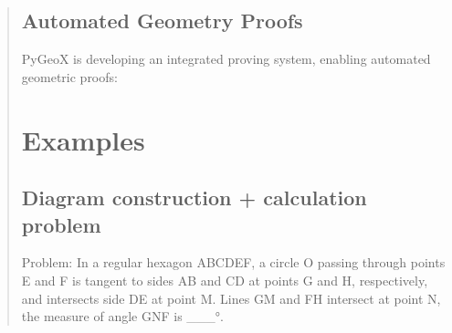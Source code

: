 \documentclass[letterpaper,10pt,english]{sphinxmanual}
\begin{document}
\begin{quote}
\section{Automated Geometry Proofs}
\label{\detokenize{index:automated-geometry-proofs}}
\sphinxAtStartPar
PyGeoX is developing an integrated proving system, enabling automated geometric proofs:

\begin{sphinxVerbatim}[commandchars=\\\{\}]
   
      

\end{sphinxVerbatim}

\sphinxstepscope


\chapter{Examples}
\label{\detokenize{examples:examples}}\label{\detokenize{examples::doc}}

\section{Diagram construction + calculation problem}
\label{\detokenize{examples:diagram-construction-calculation-problem}}
\sphinxAtStartPar
Problem: In a regular hexagon ABCDEF, a circle O passing through points E and F is tangent to sides AB and CD at points G and H, respectively, and intersects side DE at point M. Lines GM and FH intersect at point N, the measure of angle GNF is \_\_\_°.

\begin{sphinxVerbatim}[commandchars=\\\{\}]
    

  


\end{sphinxVerbatim}
\end{quote}
\end{document}
